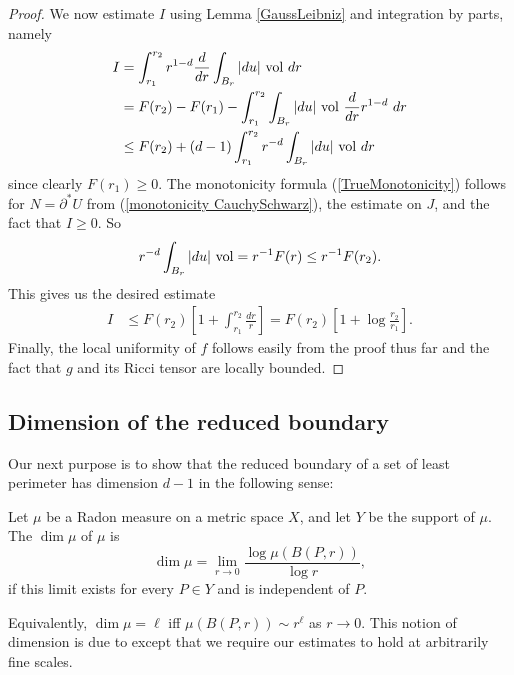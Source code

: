 \begin{proof}
We now estimate $I$ using Lemma \ref{GaussLeibniz} and integration by parts, namely
\begin{align*}
I &= \int_{r_1}^{r_2} r^{1 - d} \frac{d}{dr} \int_{B_r} |du| ~\mathrm{vol} ~dr \\
&= F(r_2) - F(r_1) - \int_{r_1}^{r_2} \int_{B_r} |du| ~\mathrm{vol} ~\frac{d}{dr} r^{1 - d} ~dr\\
&\leq F(r_2) + (d - 1) \int_{r_1}^{r_2} r^{-d} \int_{B_r} |du| ~\mathrm{vol} ~dr
\end{align*}
since clearly $F(r_1) \geq 0$.
The monotonicity formula (\ref{TrueMonotonicity}) follows for $N = \partial^* U$ from (\ref{monotonicity CauchySchwarz}), the estimate on $J$, and the fact that $I \geq 0$.
So
$$r^{-d} \int_{B_r} |du| ~\mathrm{vol} = r^{-1} F(r) \leq r^{-1} F(r_2).$$
This gives us the desired estimate
\begin{align*}
I &\leq F(r_2)\left[1 + \int_{r_1}^{r_2} \frac{dr}{r}\right] = F(r_2)\left[1 + \log\frac{r_2}{r_1}\right].
\end{align*}
Finally, the local uniformity of $f$ follows easily from the proof thus far and the fact that $g$ and its Ricci tensor are locally bounded.
\end{proof}



\subsection{Dimension of the reduced boundary}
Our next purpose is to show that the reduced boundary of a set of least perimeter has dimension $d - 1$ in the following sense:

\begin{definition}
Let $\mu$ be a Radon measure on a metric space $X$, and let $Y$ be the support of $\mu$.
The  $\dim \mu$ of $\mu$ is
$$\dim \mu = \lim_{r \to 0} \frac{\log \mu(B(P, r))}{\log r},$$
if this limit exists for every $P \in Y$ and is independent of $P$.
\end{definition}

Equivalently, $\dim \mu = \ell$ iff $\mu(B(P, r)) \sim r^\ell$ as $r \to 0$.
This notion of dimension is due to \cite[Definition 1.1]{bourgain18} except that we require our estimates to hold at arbitrarily fine scales.

